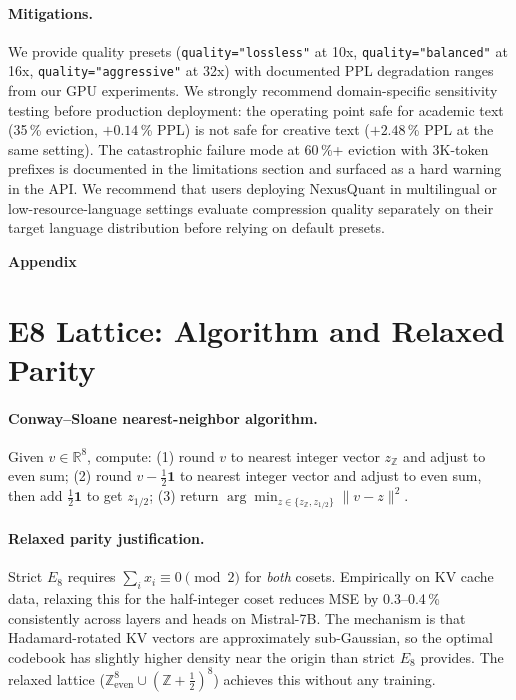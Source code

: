 \documentclass{article}
\begin{document}
\paragraph{Mitigations.}
We provide quality presets (\texttt{quality="lossless"} at 10x,
\texttt{quality="balanced"} at 16x, \texttt{quality="aggressive"} at 32x)
with documented PPL degradation ranges from our GPU experiments. We
strongly recommend domain-specific sensitivity testing before production
deployment: the operating point safe for academic text (35\,\% eviction,
$+0.14$\,\% PPL) is not safe for creative text ($+2.48$\,\% PPL at the
same setting). The catastrophic failure mode at 60\,\%+ eviction with
3K-token prefixes is documented in the limitations section and surfaced
as a hard warning in the API. We recommend that users deploying NexusQuant
in multilingual or low-resource-language settings evaluate compression
quality separately on their target language distribution before relying
on default presets.

\clearpage



\newpage
\begin{center}
{\Large \textbf{Appendix}}
\end{center}
\vspace{1em}
\appendix

\section{E8 Lattice: Algorithm and Relaxed Parity}
\label{app:e8_details}

\paragraph{Conway--Sloane nearest-neighbor algorithm.}
Given $v \in \mathbb{R}^8$, compute:
(1) round $v$ to nearest integer vector $z_\mathbb{Z}$ and adjust to even sum;
(2) round $v - \frac{1}{2}\mathbf{1}$ to nearest integer vector and adjust to
even sum, then add $\frac{1}{2}\mathbf{1}$ to get $z_{1/2}$;
(3) return $\arg\min_{z \in \{z_\mathbb{Z}, z_{1/2}\}} \|v - z\|^2$.

\paragraph{Relaxed parity justification.}
Strict $E_8$ requires $\sum_i x_i \equiv 0 \pmod{2}$ for \emph{both} cosets.
Empirically on KV cache data, relaxing this for the half-integer coset
reduces MSE by 0.3--0.4\,\% consistently across layers and heads on
Mistral-7B. The mechanism is that Hadamard-rotated KV vectors are
approximately sub-Gaussian, so the optimal codebook has slightly higher
density near the origin than strict $E_8$ provides. The relaxed lattice
($\mathbb{Z}^8_\text{even} \cup (\mathbb{Z}+\tfrac{1}{2})^8$) achieves this
without any training.
\end{document}
